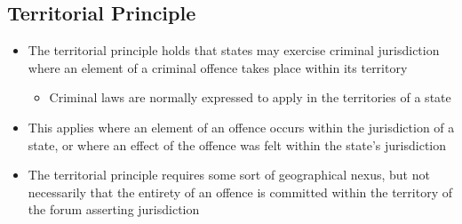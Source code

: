\subsection{Territorial Principle}
\begin{itemize}
    \item The territorial principle holds that states may exercise criminal jurisdiction where an element of a criminal offence takes place within its territory
    \begin{itemize}
        \item Criminal laws are normally expressed to apply in the territories of a state
    \end{itemize}
    \item This applies where an element of an offence occurs within the jurisdiction of a state, or where an effect of the offence was felt within the state's jurisdiction
    \item The territorial principle requires some sort of geographical nexus, but not necessarily that the entirety of an offence is committed within the territory of the forum asserting jurisdiction
\end{itemize}

